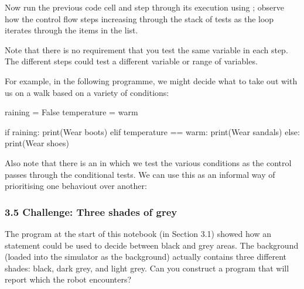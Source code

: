 \documentclass[letterpaper,10pt,english]{sphinxmanual}
\begin{document}
{Now run the previous code cell and step through its execution using ; observe how the control flow steps increasing through the stack of  tests as the  loop iterates through the items in the  list.

Note that there is no requirement that you test the same variable in each step. The different steps could test a different variable or range of variables.

For example, in the following programme, we might decide what to take out with us on a walk based on a variety of conditions:

{
\begin{sphinxVerbatim}[commandchars=\\\{\}]
\llap{\color{nbsphinxin}[ ]:\,\hspace{\fboxrule}\hspace{\fboxsep}}raining = False
temperature = \PYGZsq{}warm\PYGZsq{}

if raining:
    print(\PYGZdq{}Wear boots\PYGZdq{})
elif temperature == \PYGZsq{}warm\PYGZsq{}:
    print(\PYGZdq{}Wear sandals\PYGZdq{})
else:
    print(\PYGZdq{}Wear shoes\PYGZdq{})
\end{sphinxVerbatim}
}

Also note that there is an  in which we test the various conditions as the control passes through the  conditional tests. We can use this as an informal way of prioritising one behaviout over another:

\begin{sphinxVerbatim}[commandchars=\\\{\}]
 
 
  
\end{sphinxVerbatim}


\subsubsection{3.5 Challenge: Three shades of grey}
\label{\detokenize{content/02_Robot_Lab/Section_00_02:3.5-Challenge:-Three-shades-of-grey}}
The program at the start of this notebook (in Section 3.1) showed how an  statement could be used to decide between black and grey areas. The background (loaded into the simulator as the  background) actually contains three different shades: black, dark grey, and light grey. Can you construct a program that will report which the robot encounters?

}
\end{document}

